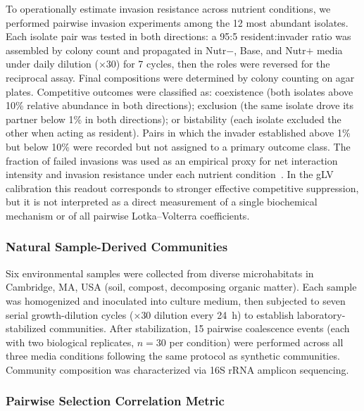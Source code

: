 To operationally estimate invasion resistance across nutrient conditions, we performed pairwise invasion experiments among the 12 most abundant isolates. Each isolate pair was tested in both directions: a 95:5 resident:invader ratio was assembled by colony count and propagated in Nutr$-$, Base, and Nutr$+$ media under daily dilution ($\times$30) for 7 cycles, then the roles were reversed for the reciprocal assay. Final compositions were determined by colony counting on agar plates. Competitive outcomes were classified as: coexistence (both isolates above 10\% relative abundance in both directions); exclusion (the same isolate drove its partner below 1\% in both directions); or bistability (each isolate excluded the other when acting as resident). Pairs in which the invader established above 1\% but below 10\% were recorded but not assigned to a primary outcome class. The fraction of failed invasions was used as an empirical proxy for net interaction intensity and invasion resistance under each nutrient condition~\citep{Hu2025,Kurkjian2021,Ratzke2020}. In the gLV calibration this readout corresponds to stronger effective competitive suppression, but it is not interpreted as a direct measurement of a single biochemical mechanism or of all pairwise Lotka--Volterra coefficients.


\subsubsection*{Natural Sample-Derived Communities}
\label{sec:suppl:natural}

Six environmental samples were collected from diverse microhabitats in Cambridge, MA, USA (soil, compost, decomposing organic matter). Each sample was homogenized and inoculated into culture medium, then subjected to seven serial growth-dilution cycles ($\times$30 dilution every 24~h) to establish laboratory-stabilized communities. After stabilization, 15 pairwise coalescence events (each with two biological replicates, $n = 30$ per condition) were performed across all three media conditions following the same protocol as synthetic communities. Community composition was characterized via 16S rRNA amplicon sequencing.


\subsubsection*{Pairwise Selection Correlation Metric}
\label{sec:suppl:methods:concordance}

